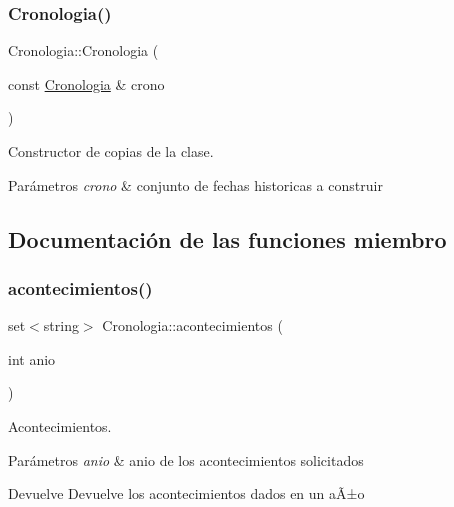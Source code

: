 \subsubsection{\texorpdfstring{Cronologia()}{Cronologia()}\hspace{0.1cm}{\footnotesize\ttfamily [2/2]}}
{\footnotesize\ttfamily Cronologia\+::\+Cronologia (\begin{DoxyParamCaption}\item[{const \hyperlink{classCronologia}{Cronologia} \&}]{crono }\end{DoxyParamCaption})}



Constructor de copias de la clase. 


\begin{DoxyParams}{Parámetros}
{\em crono} & conjunto de fechas historicas a construir \\
\hline
\end{DoxyParams}


\subsection{Documentación de las funciones miembro}
\mbox{\label{classCronologia_a58cfb3b166f4af26c8a66ea63d163a22}} 
\subsubsection{\texorpdfstring{acontecimientos()}{acontecimientos()}}
{\footnotesize\ttfamily set$<$string$>$ Cronologia\+::acontecimientos (\begin{DoxyParamCaption}\item[{int}]{anio }\end{DoxyParamCaption})}



Acontecimientos. 


\begin{DoxyParams}{Parámetros}
{\em anio} & anio de los acontecimientos solicitados \\
\hline
\end{DoxyParams}
\begin{DoxyReturn}{Devuelve}
Devuelve los acontecimientos dados en un aÃ±o 
\end{DoxyReturn}
\mbox{\label{classCronologia_ab6b38ffe6f9e9f221293f365d0208294}} 
